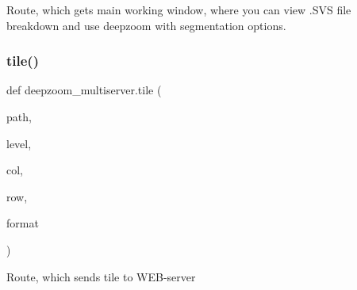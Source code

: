 \begin{DoxyVerb}Route, which gets main working window, where you can view .SVS file breakdown and use deepzoom with segmentation options.
\end{DoxyVerb}
 \mbox{\label{namespacedeepzoom__multiserver_a633157037a59696c55ee277585045681}} 
\subsubsection{\texorpdfstring{tile()}{tile()}}
{\footnotesize\ttfamily def deepzoom\+\_\+multiserver.\+tile (\begin{DoxyParamCaption}\item[{}]{path,  }\item[{}]{level,  }\item[{}]{col,  }\item[{}]{row,  }\item[{}]{format }\end{DoxyParamCaption})}

\begin{DoxyVerb}Route, which sends tile to WEB-server
\end{DoxyVerb}
 